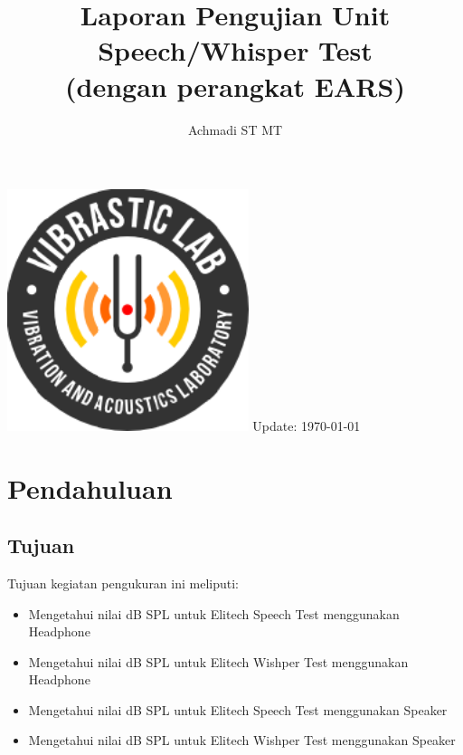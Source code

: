 \documentclass[12pt,]{article}
\title{\LARGE \bf
	Laporan Pengujian Unit Speech/Whisper Test\\
	(dengan perangkat EARS)
}
\author{Achmadi ST MT}
\date{}
\begin{document}
	\thispagestyle{empty}
	\pagestyle{empty}

	\begin{titlepage}
		\centering
		\vfill
		\vfill
		\maketitle
		\vfill
		\includegraphics[width=200pt]{images/logo/logoviblab}
		\vfill
		\vfill
		Update: {\today} \currenttime \\
	\end{titlepage}


	\newpage
	\tableofcontents


	\newpage
	\section{Pendahuluan}

	\subsection{Tujuan}

	Tujuan kegiatan pengukuran ini meliputi:
	\begin{itemize}
		\item Mengetahui nilai dB SPL untuk Elitech Speech Test menggunakan Headphone
		\item Mengetahui nilai dB SPL untuk Elitech Wishper Test menggunakan Headphone
		\item Mengetahui nilai dB SPL untuk Elitech Speech Test menggunakan Speaker
		\item Mengetahui nilai dB SPL untuk Elitech Wishper Test menggunakan Speaker
	\end{itemize}
\end{document}
